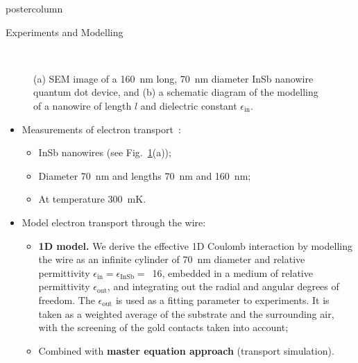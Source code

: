 \documentclass[xelatex,final,hyperref={pdfpagelabels=true,setpagesize=false,colorlinks=false},xcolor={usenames,dvipsnames,svgnames},notheorems]{beamer}
\begin{document}
\begin{frame}
\begin{columns}
\begin{column}{.32\textwidth}
\begin{beamercolorbox}[center,wd=\textwidth]{postercolumn}
\begin{minipage}[T]{.95\textwidth}
{\begin{block}{Experiments and Modelling\phantom{Gg}}
\begin{figure}
{                }
                \\[1em]
                \caption{(a) SEM image of a 160~nm long, 70~nm diameter InSb nanowire quantum dot device, and (b) a schematic diagram of the modelling of a nanowire of length $l$ and dielectric constant $\epsilon_\text{in}$.}
                \label{fig:wire}
              \end{figure}
              \begin{itemize}
                \item Measurements of electron transport~\cite{NilssonNL2009}:
                \begin{itemize}
                  \item InSb nanowires (see Fig.~\ref{fig:wire}(a));
                  \item Diameter 70~nm and lengths 70~nm and 160~nm;
                  \item At temperature 300~mK.
                \end{itemize}
                \item Model electron transport through the wire:
                \begin{itemize}
                  \item \textbf{1D model.} We derive the effective 1D Coulomb interaction by modelling the wire as an infinite cylinder of 70~nm diameter and relative permittivity $\epsilon_\text{in}=\epsilon_\text{InSb}=$~16, embedded in a medium of relative permittivity $\epsilon_\text{out}$, and integrating out the radial and angular degrees of freedom. The $\epsilon_\text{out}$ is used as a fitting parameter to experiments. It is taken as a weighted average of the substrate and the surrounding air, with the screening of the gold contacts taken into account;
                  \item Combined with \textbf{master equation approach} (transport simulation). %
                \end{itemize}
              \end{itemize}
            \end{block}
          }
        \end{minipage}
      \end{beamercolorbox}
    \end{column}



\end{columns}
\end{frame}
\end{document}
